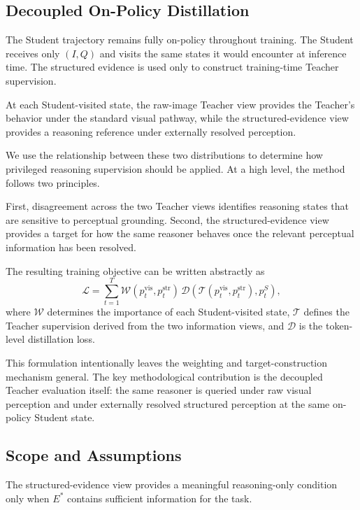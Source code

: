 \subsection{Decoupled On-Policy Distillation}

The Student trajectory remains fully on-policy throughout training.
The Student receives only $(I,Q)$ and visits the same states it would encounter at inference time.
The structured evidence is used only to construct training-time Teacher supervision.

At each Student-visited state, the raw-image Teacher view provides the Teacher's behavior under the standard visual pathway, while the structured-evidence view provides a reasoning reference under externally resolved perception.

We use the relationship between these two distributions to determine how privileged reasoning supervision should be applied.
At a high level, the method follows two principles.

First, disagreement across the two Teacher views identifies reasoning states that are sensitive to perceptual grounding.
Second, the structured-evidence view provides a target for how the same reasoner behaves once the relevant perceptual information has been resolved.

The resulting training objective can be written abstractly as
\[
\mathcal{L}
=
\sum_{t=1}^{T}
\mathcal{W}
\left(
p_t^{\mathrm{vis}},
p_t^{\mathrm{str}}
\right)
\,
\mathcal{D}
\left(
\mathcal{T}
\left(
p_t^{\mathrm{vis}},
p_t^{\mathrm{str}}
\right),
p_t^S
\right),
\]
where $\mathcal{W}$ determines the importance of each Student-visited state, $\mathcal{T}$ defines the Teacher supervision derived from the two information views, and $\mathcal{D}$ is the token-level distillation loss.

This formulation intentionally leaves the weighting and target-construction mechanism general.
The key methodological contribution is the decoupled Teacher evaluation itself: the same reasoner is queried under raw visual perception and under externally resolved structured perception at the same on-policy Student state.

\subsection{Scope and Assumptions}

The structured-evidence view provides a meaningful reasoning-only condition only when $E^*$ contains sufficient information for the task.

